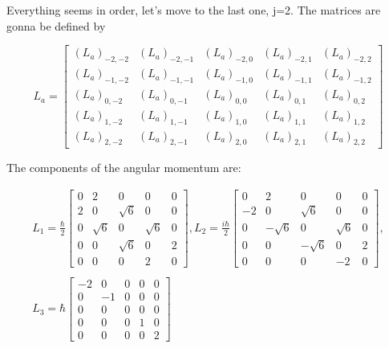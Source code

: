 Everything seems in order, let's move to the last one, j=2. The matrices are gonna be defined by

\begin{equation}
  L_a =
    \left[\begin{matrix}
      (L_a)_{-2,-2} & (L_a)_{-2,-1} & (L_a)_{-2,0} & (L_a)_{-2,1} & (L_a)_{-2,2}\\
      (L_a)_{-1,-2} & (L_a)_{-1,-1} & (L_a)_{-1,0} & (L_a)_{-1,1} & (L_a)_{-1,2}\\
      (L_a)_{0,-2} & (L_a)_{0,-1} & (L_a)_{0,0} & (L_a)_{0,1} & (L_a)_{0,2}\\
      (L_a)_{1,-2} & (L_a)_{1,-1} & (L_a)_{1,0} & (L_a)_{1,1} & (L_a)_{1,2}\\
      (L_a)_{2,-2} & (L_a)_{2,-1} & (L_a)_{2,0} & (L_a)_{2,1} & (L_a)_{2,2}
    \end{matrix}\right]
\end{equation}

The components of the angular momentum are:

\begin{equation}
  \begin{array}{c}
    L_1 = \frac{\hbar}{2}\left[\begin{matrix}
      0 & 2 & 0 & 0 & 0\\
      2 & 0 & \sqrt{6} & 0 & 0\\
      0 & \sqrt{6} & 0 & \sqrt{6} & 0\\
      0 & 0 & \sqrt{6} & 0 & 2\\
      0 & 0 & 0 & 2 & 0
    \end{matrix}\right],
    L_2 = \frac{i\hbar}{2}\left[\begin{matrix}
      0 & 2 & 0 & 0 & 0\\
      -2 & 0 & \sqrt{6} & 0 & 0\\
      0 & -\sqrt{6} & 0 & \sqrt{6} & 0\\
      0 & 0 & -\sqrt{6} & 0 & 2\\
      0 & 0 & 0 & -2 & 0
    \end{matrix}\right],
    \\

    \\
    L_3 = \hbar\left[\begin{matrix}
      -2 & 0 & 0 & 0 & 0\\
      0 & -1 & 0 & 0 & 0\\
      0 & 0 & 0 & 0 & 0\\
      0 & 0 & 0 & 1 & 0\\
      0 & 0 & 0 & 0 & 2
    \end{matrix}\right]
  \end{array}
\end{equation}

